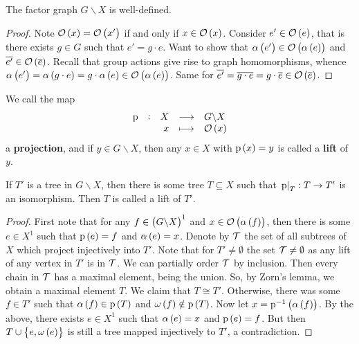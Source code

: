 \begin{lemma}
The factor graph $ G \backslash X $ is well-defined.
\end{lemma}

\begin{proof}
Note $ \OOO\br{x} = \OOO\br{x'} $ if and only if $ x \in \OOO\br{x} $. Consider $ e' \in \OOO\br{e} $, that is there exists $ g \in G $ such that $ e' = g \cdot e $. Want to show that $ \alpha\br{e'} \in \OOO\br{\alpha\br{e}} $ and $ \overline{e'} \in \OOO\br{\overline{e}} $. Recall that group actions give rise to graph homomorphisms, whence $ \alpha\br{e'} = \alpha\br{g \cdot e} = g \cdot \alpha\br{e} \in \OOO\br{\alpha\br{e}} $. Same for $ \overline{e'} = \overline{g \cdot e} = g \cdot \overline{e} \in \OOO\br{\overline{e}} $.
\end{proof}

\begin{definition}
We call the map
$$ \function[\p]{X}{G \backslash X}{x}{\OOO\br{x}} $$
a \textbf{projection}, and if $ y \in G \backslash X $, then any $ x \in X $ with $ \p\br{x} = y $ is called a \textbf{lift} of $ y $.
\end{definition}

\begin{proposition}
\label{prop:1.6.18}
If $ T' $ is a tree in $ G \backslash X $, then there is some tree $ T \subseteq X $ such that $ \left. \mathrm{p} \right|_T : T \to T' $ is an isomorphism. Then $ T $ is called a lift of $ T' $.
\end{proposition}

\begin{proof}
First note that for any $ f \in \br{G \backslash X}^1 $ and $ x \in \OOO\br{\alpha\br{f}} $, then there is some $ e \in X^1 $ such that $ \p\br{e} = f $ and $ \alpha\br{e} = x $. Denote by $ \mathcal{T} $ the set of all subtrees of $ X $ which project injectively into $ T' $. Note that for $ T' \ne \emptyset $ the set $ \mathcal{T} \ne \emptyset $ as any lift of any vertex in $ T' $ is in $ \mathcal{T} $. We can partially order $ \mathcal{T} $ by inclusion. Then every chain in $ \mathcal{T} $ has a maximal element, being the union. So, by Zorn's lemma, we obtain a maximal element $ T $. We claim that $ T \cong T' $. Otherwise, there was some $ f \in T' $ such that $ \alpha\br{f} \in \p\br{T} $ and $ \omega\br{f} \notin \p\br{T} $. Now let $ x = \p^{-1}\br{\alpha\br{f}} $. By the above, there exists $ e \in X^1 $ such that $ \alpha\br{e} = x $ and $ \p\br{e} = f $. But then $ T \cup \cbr{e, \omega\br{e}} $ is still a tree mapped injectively to $ T' $, a contradiction.
\end{proof}

